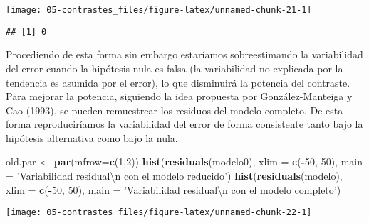 \documentclass[]{book}
\newenvironment{Shaded}{\begin{snugshade}}{\end{snugshade}}
\newcommand{\KeywordTok}[1]{\textcolor[rgb]{0.13,0.29,0.53}{\textbf{#1}}}
\newcommand{\DataTypeTok}[1]{\textcolor[rgb]{0.13,0.29,0.53}{#1}}
\newcommand{\DecValTok}[1]{\textcolor[rgb]{0.00,0.00,0.81}{#1}}
\newcommand{\CharTok}[1]{\textcolor[rgb]{0.31,0.60,0.02}{#1}}
\newcommand{\StringTok}[1]{\textcolor[rgb]{0.31,0.60,0.02}{#1}}
\newcommand{\CommentTok}[1]{\textcolor[rgb]{0.56,0.35,0.01}{\textit{#1}}}
\newcommand{\OperatorTok}[1]{\textcolor[rgb]{0.81,0.36,0.00}{\textbf{#1}}}
\newcommand{\NormalTok}[1]{#1}
\theoremstyle{break}
\theoremstyle{definition}
\theoremstyle{definition}
\theoremstyle{definition}
\theoremstyle{remark}
\begin{document}
\begin{center}\texttt{[image: 05-contrastes\_files/figure-latex/unnamed-chunk-21-1]} \end{center}

\begin{Shaded}
\end{Shaded}

\begin{verbatim}
## [1] 0
\end{verbatim}

Procediendo de esta forma sin embargo estaríamos sobreestimando la
variabilidad del error cuando la hipótesis nula es falsa (la
variabilidad no explicada por la tendencia es asumida por el error), lo
que disminuirá la potencia del contraste. Para mejorar la potencia,
siguiendo la idea propuesta por González-Manteiga y Cao (1993), se
pueden remuestrear los residuos del modelo completo. De esta forma
reproduciríamos la variabilidad del error de forma consistente tanto
bajo la hipótesis alternativa como bajo la nula.

\begin{Shaded}
\begin{Highlighting}[]
\NormalTok{old.par <-}\StringTok{ }\KeywordTok{par}\NormalTok{(}\DataTypeTok{mfrow=}\KeywordTok{c}\NormalTok{(}\DecValTok{1}\NormalTok{,}\DecValTok{2}\NormalTok{))}
\KeywordTok{hist}\NormalTok{(}\KeywordTok{residuals}\NormalTok{(modelo0), }\DataTypeTok{xlim =} \KeywordTok{c}\NormalTok{(}\OperatorTok{-}\DecValTok{50}\NormalTok{, }\DecValTok{50}\NormalTok{), }
     \DataTypeTok{main =} \StringTok{'Variabilidad residual}\CharTok{\textbackslash{}n}\StringTok{ con el modelo reducido'}\NormalTok{)}
\KeywordTok{hist}\NormalTok{(}\KeywordTok{residuals}\NormalTok{(modelo), }\DataTypeTok{xlim =} \KeywordTok{c}\NormalTok{(}\OperatorTok{-}\DecValTok{50}\NormalTok{, }\DecValTok{50}\NormalTok{), }
     \DataTypeTok{main =} \StringTok{'Variabilidad residual}\CharTok{\textbackslash{}n}\StringTok{ con el modelo completo'}\NormalTok{)}
\end{Highlighting}
\end{Shaded}

\begin{center}\texttt{[image: 05-contrastes\_files/figure-latex/unnamed-chunk-22-1]} \end{center}
\end{document}
